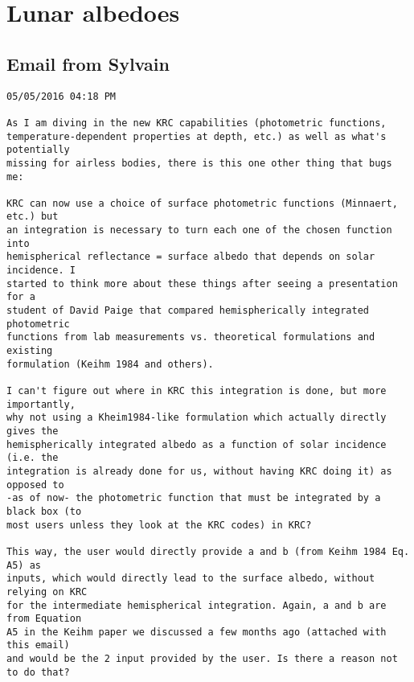 \documentclass{article}
\begin{document}


\appendix %

\section{Lunar albedoes \label{LA} }

\subsection{Email from Sylvain}
\vspace{-3.mm} 
\begin{verbatim}
05/05/2016 04:18 PM

As I am diving in the new KRC capabilities (photometric functions,
temperature-dependent properties at depth, etc.) as well as what's potentially
missing for airless bodies, there is this one other thing that bugs me:

KRC can now use a choice of surface photometric functions (Minnaert, etc.) but
an integration is necessary to turn each one of the chosen function into
hemispherical reflectance = surface albedo that depends on solar incidence. I
started to think more about these things after seeing a presentation for a
student of David Paige that compared hemispherically integrated photometric
functions from lab measurements vs. theoretical formulations and existing
formulation (Keihm 1984 and others).

I can't figure out where in KRC this integration is done, but more importantly,
why not using a Kheim1984-like formulation which actually directly gives the
hemispherically integrated albedo as a function of solar incidence (i.e. the
integration is already done for us, without having KRC doing it) as opposed to
-as of now- the photometric function that must be integrated by a black box (to
most users unless they look at the KRC codes) in KRC?

This way, the user would directly provide a and b (from Keihm 1984 Eq. A5) as
inputs, which would directly lead to the surface albedo, without relying on KRC
for the intermediate hemispherical integration. Again, a and b are from Equation
A5 in the Keihm paper we discussed a few months ago (attached with this email)
and would be the 2 input provided by the user. Is there a reason not to do that?


\end{verbatim}
\end{document}
